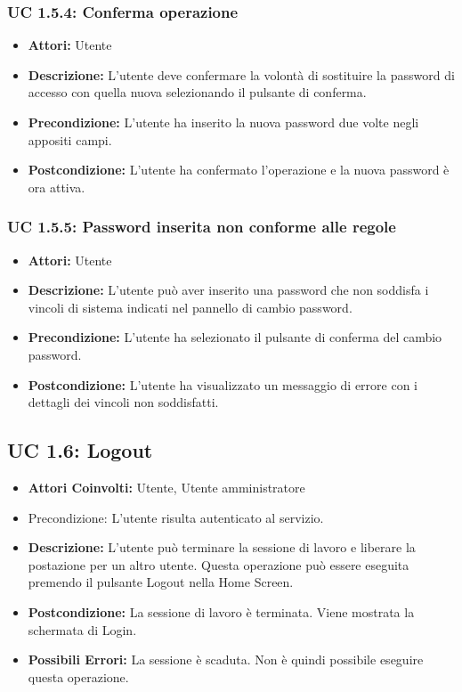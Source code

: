\subsubsection{UC 1.5.4: Conferma operazione}

\begin{itemize}
\item \textbf{Attori:} Utente
\item \textbf{Descrizione:} L'utente deve confermare la volontà di sostituire la password di accesso con quella nuova selezionando il pulsante di conferma.
\item \textbf{Precondizione:} L'utente ha inserito la nuova password due volte negli appositi campi.
\item \textbf{Postcondizione:} L'utente ha confermato l'operazione e la nuova password è ora attiva.
\end{itemize}

\subsubsection{UC 1.5.5: Password inserita non conforme alle regole}

\begin{itemize}
\item \textbf{Attori:} Utente
\item \textbf{Descrizione:} L'utente può aver inserito una password che non soddisfa i vincoli di sistema indicati nel pannello di cambio password.
\item \textbf{Precondizione:} L'utente ha selezionato il pulsante di conferma del cambio password.
\item \textbf{Postcondizione:} L'utente ha visualizzato un messaggio di errore con i dettagli dei vincoli non soddisfatti.
\end{itemize}

\subsection{UC 1.6: Logout}

\begin{itemize}
\item \textbf{Attori Coinvolti:} Utente, Utente amministratore
\item {Precondizione:} L'utente risulta autenticato al servizio.
\item \textbf{Descrizione:} L'utente può terminare la sessione di lavoro e liberare la postazione per un altro utente. Questa operazione può essere eseguita premendo il pulsante Logout nella Home Screen.
\item \textbf{Postcondizione:} La sessione di lavoro è terminata. Viene mostrata la schermata di Login.
\item \textbf{Possibili Errori:} La sessione è scaduta. Non è quindi possibile eseguire questa operazione.
\end{itemize}

